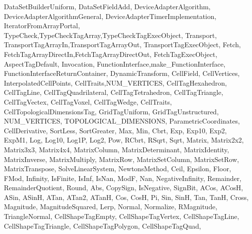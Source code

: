 {{                   DataSetBuilderUniform,
                   DataSetFieldAdd,
                   DeviceAdapterAlgorithm, DeviceAdapterAlgorithmGeneral,
                   DeviceAdapterTimerImplementation,
                   IteratorFromArrayPortal,
                   TypeCheck,TypeCheckTagArray,TypeCheckTagExecObject,
                   Transport,
                   TransportTagArrayIn,TransportTagArrayOut,
                   TransportTagExecObject,
                   Fetch,
                   FetchTagArrayDirectIn,FetchTagArrayDirectOut,
                   FetchTagExecObject,
                   AspectTagDefault,
                   Invocation,
                   FunctionInterface,make_FunctionInterface,
                   FunctionInterfaceReturnContainer,
                   DynamicTransform,
                   CellField, CellVertices,
                   InterpolatedCellPoints,
                   CellTraits,NUM_VERTICES,
                   CellTagHexahedron, CellTagLine, CellTagQuadrilateral,
                   CellTagTetrahedron, CellTagTriangle, CellTagVectex,
                   CellTagVoxel, CellTagWedge,
                   CellTraits,
                   CellTopologicalDimensionsTag,
                   GridTagUniform, GridTagUnstructured,
                   NUM_VERTICES, TOPOLOGICAL_DIMENSIONS,
                   ParametricCoordinates, CellDerivative,
                   SortLess, SortGreater,
                   Max, Min,
                   Cbrt, Exp, Exp10, Exp2, ExpM1, Log, Log10, Log1P, Log2,
                   Pow, RCbrt, RSqrt, Sqrt,
                   Matrix, Matrix2x2, Matrix3x3, Matrix4x4,
                   MatrixColumn, MatrixDeterminant, MatrixIdentity,
                   MatrixInverse, MatrixMultiply, MatrixRow,
                   MatrixSetColumn, MatrixSetRow, MatrixTranspose,
                   SolveLinearSystem,
                   NewtonsMethod,
                   Ceil, Epsilon, Floor, FMod, Infinity, IsFinite, IsInf,
                   IsNan, ModF, Nan, NegativeInfinity, Remainder,
                   RemainderQuotient, Round,
                   Abs, CopySign, IsNegative, SignBit,
                   ACos, ACosH, ASin, ASinH, ATan, ATan2, ATanH, Cos, CosH,
                   Pi, Sin, SinH, Tan, TanH,
                   Cross, Magnitude, MagnitudeSquared, Lerp, Normal,
                   Normalize, RMagnitude, TriangleNormal,
                   CellShapeTagEmpty,
                   CellShapeTagVertex,
                   CellShapeTagLine,
                   CellShapeTagTriangle,
                   CellShapeTagPolygon,
                   CellShapeTagQuad,
}}
